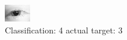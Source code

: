 \begin{figure}[h!]
\begin{center}
\includegraphics[width=0.60\columnwidth]{figures/ID17_class_4_target_3.png}
\end{center}
\caption{ Classification: 4 actual target: 3}
\label{fig:ID17_class_4_target_3}
\end{figure}
